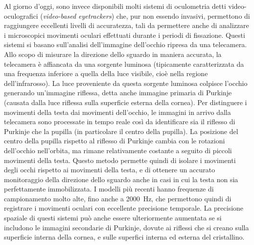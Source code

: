 \documentclass[12pt]{article}
\begin{document}
Al giorno d'oggi, sono invece disponibili molti sistemi di oculometria detti video-oculografici (\textit{video-based eyetrackers}) che, pur non essendo invasivi, permettono di raggiungere eccellenti livelli di accuratezza, tali da permettere anche di analizzare i microscopici movimenti oculari effettuati durante i periodi di fissazione. Questi sistemi si basano sull'analisi dell'immagine dell'occhio ripresa da una telecamera. Allo scopo di misurare la direzione dello sguardo in maniera accurata, la telecamera è affiancata da una sorgente luminosa (tipicamente caratterizzata da una frequenza inferiore a quella della luce visibile, cioè nella regione dell'infrarosso). La luce proveniente da questa sorgente luminosa colpisce l'occhio generando un'immagine riflessa, detta anche immagine primaria di Purkinje (causata dalla luce riflessa sulla superficie esterna della cornea). Per distinguere i movimenti della testa dai movimenti dell'occhio, le immagini in arrivo dalla telecamera sono processate in tempo reale così da identificare sia il riflesso di Purkinje che la pupilla (in particolare il centro della pupilla). La posizione del centro della pupilla rispetto al riflesso di Purkinje cambia con le rotazioni dell'occhio nell'orbita, ma rimane relativamente costante a seguito di piccoli movimenti della testa. Questo metodo permette quindi di isolare i movimenti degli occhi rispetto ai movimenti della testa, e di ottenere un accurato monitoraggio della direzione dello sguardo anche in casi in cui la testa non sia perfettamente immobilizzata. I modelli più recenti hanno frequenze di campionamento molto alte, fino anche a 2000~Hz, che permettono quindi di registrare i movimenti oculari con eccellente precisione temporale. La precisione spaziale di questi sistemi può anche essere ulteriormente aumentata se si includono le immagini secondarie di Purkinje, dovute ai riflessi che si creano sulla superficie interna della cornea, e sulle superfici interna ed esterna del cristallino.  
\end{document}
